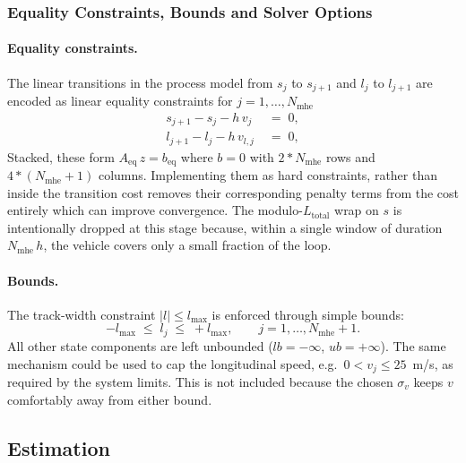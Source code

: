 \documentclass{article}
\begin{document}
\subsubsection{Equality Constraints, Bounds and Solver Options}
\label{subsubsec:est_constr}

\paragraph{Equality constraints.}
The linear transitions in the process model from $s_j$ to $s_{j+1}$ and $l_j$ to $l_{j+1}$ are encoded as linear equality constraints for $j = 1,\ldots,N_{\text{mhe}}$
\begin{align}
    s_{j+1} - s_{j} - h\,v_{j} \;&=\; 0, \label{eq:eq_constr_s}\\
    l_{j+1} - l_{j} - h\,v_{l,j} \;&=\; 0, \label{eq:eq_constr_l}
\end{align}
Stacked, these form $A_{\text{eq}}\,z = b_{\text{eq}}$  where $b=0$ with $2*N_{\text{mhe}}$ rows and $4*(N_{\text{mhe}}+1)$ columns. Implementing them as hard constraints, rather than inside the transition cost removes their corresponding penalty terms from the cost entirely which can improve convergence. The modulo-$L_{\text{total}}$ wrap on $s$ is intentionally dropped at this stage because, within a single window of duration $N_{\text{mhe}}\,h$, the vehicle covers only a small fraction of the loop.

\paragraph{Bounds.}
The track-width constraint $|l|\leq l_{\max}$ is enforced through simple bounds:
\begin{equation}
    -l_{\max} \;\leq\; l_{j} \;\leq\; +l_{\max}, \qquad j = 1,\ldots,N_{\text{mhe}}+1.
    \label{eq:est_bounds}
\end{equation}
All other state components are left unbounded ($lb = -\infty$, $ub = +\infty$). The same mechanism could be used to cap the longitudinal speed, e.g.\ $0 < v_{j} \leq 25$~m/s, as required by the system limits. This is not included because the chosen $\sigma_{v}$ keeps $v$ comfortably away from either bound.

\subsection{Estimation}
\label{subsec:est_params}
\end{document}

